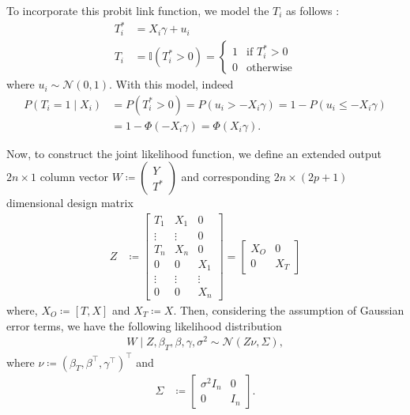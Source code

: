 \documentclass[preprint,12pt]{elsarticle}
\newcommand{\normal}{\mathcal{N}}
\begin{document}
To incorporate this probit
link function, we model the $T_i$ as follows \citep{albert93}:
\begin{align}
    T_i^* &= X_i\gamma +u_i \\
    T_i   &= \mathbb{I}(T_i^*>0)
    =
    \begin{cases}
    1 & \text{if }T_i^*>0 \\
    0 & \text{otherwise}
    \end{cases}
\end{align}
where $u_i\sim\mathcal{N}(0,1)$.
With this model, indeed
\begin{align}
  P(T_i=1\mid X_i)
  &=P(T_i^*>0)=P(u_i>-X_i\gamma)=1-P(u_i\le -X_i\gamma) \\
  &=1-\Phi(-X_i\gamma)=\Phi(X_i\gamma).
\end{align}

Now, to construct the joint likelihood function, we define an extended
output $2n\times 1$ column vector
$W\coloneqq\left(\begin{smallmatrix}Y \\ T^*\end{smallmatrix}\right)$
and corresponding $2n\times(2p+1)$ dimensional design matrix
\begin{align}
	Z &\coloneqq
        \begin{bmatrix}
           T_1 & X_1 & 0 \\
           \vdots & \vdots & 0 \\
           T_n & X_n & 0 \\
           0 & 0 & X_1 \\
           \vdots & \vdots & \vdots \\
           0 & 0 & X_n
        \end{bmatrix}
        =
	\begin{bmatrix}
		X_O & 0 \\
		0 & X_T
	\end{bmatrix}
\end{align}
where, $X_O \coloneqq [T, X]$ and $X_T \coloneqq X$. Then, considering the assumption of
Gaussian error terms, we have the following likelihood distribution
\begin{align}
	W\mid Z, \beta_T, \beta, \gamma, \sigma^2 \sim\normal\left(Z\nu, \Sigma\right)\label{eq:like:group},
\end{align}
where $\nu \coloneqq (\beta_T, \beta^{\top}, \gamma^{\top})^{\top}$ and
\begin{align}
	\Sigma &\coloneqq
	\begin{bmatrix}
		\sigma^2{I}_n & 0 \\
		0 & {I}_n
	\end{bmatrix}.
\end{align}
\end{document}
